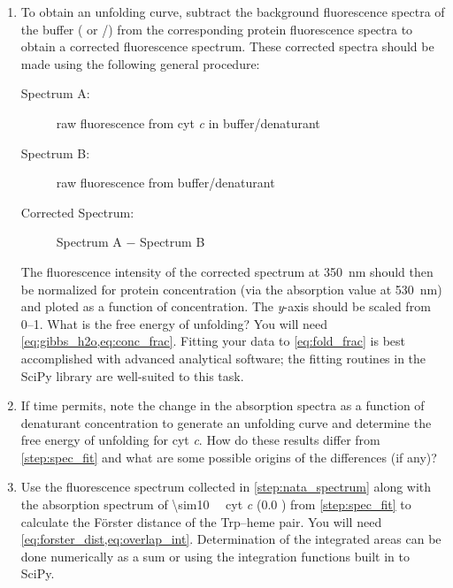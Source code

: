 \documentclass[nobib,nofonts,nols,nohyper]{tufte-handout}
\begin{document}
\begin{enumerate}
	\item To obtain an unfolding curve, subtract the background fluorescence spectra of the buffer ( or /) from the corresponding protein fluorescence spectra to obtain a corrected fluorescence spectrum. 
	These corrected spectra should be made using the following general procedure:
	\begin{description}
		\item [Spectrum A:] raw fluorescence from cyt \emph{c} in buffer/denaturant
		\item [Spectrum B:] raw fluorescence from buffer/denaturant
		\item [Corrected Spectrum:] Spectrum A \( - \) Spectrum B
	\end{description}
	The fluorescence intensity of the corrected spectrum at \qty{350}{\nm} should then be normalized for protein concentration (via the absorption value at \qty{530}{\nm}) and ploted as a function of  concentration. 
	The \emph{y}-axis should be scaled from \numrange{0}{1}. 
	What is the free energy of unfolding?
	You will need \cref{eq:gibbs_h2o,eq:conc_frac}. 
	Fitting your data to \cref{eq:fold_frac} is best accomplished with advanced analytical software; the fitting routines in the SciPy library are well-suited to this task. 
	\label{step:spec_fit}
	\item If time permits, note the change in the absorption spectra as a function of denaturant concentration to generate an unfolding curve and determine the free energy of unfolding for cyt \emph{c}. 
	How do these results differ from \cref{step:spec_fit} and what are some possible origins of the differences (if any)?
	\item Use the fluorescence spectrum collected in \cref{step:nata_spectrum} along with the absorption spectrum of \qty{\sim10}{\micro\Molar} cyt \emph{c} (\qty{0.0}{\Molar} ) from \cref{step:spec_fit} to calculate the Förster distance of the Trp--heme pair. 
	You will need \cref{eq:forster_dist,eq:overlap_int}.
	Determination of the integrated areas can be done numerically as a sum or using the integration functions built in to SciPy.

\end{enumerate}
\end{document}
